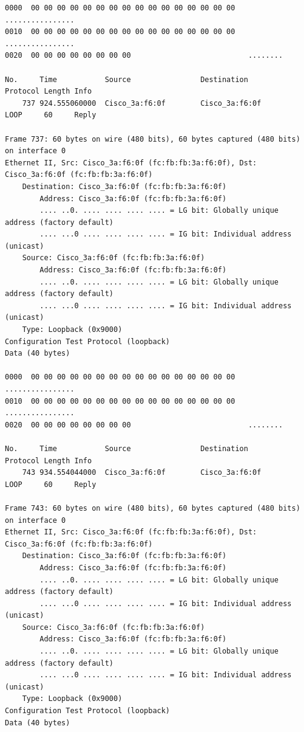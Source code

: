 \documentclass[a4paper,11pt]{article}
\begin{document}
\begin{lstlisting}
0000  00 00 00 00 00 00 00 00 00 00 00 00 00 00 00 00   ................
0010  00 00 00 00 00 00 00 00 00 00 00 00 00 00 00 00   ................
0020  00 00 00 00 00 00 00 00                           ........

No.     Time           Source                Destination           Protocol Length Info
    737 924.555060000  Cisco_3a:f6:0f        Cisco_3a:f6:0f        LOOP     60     Reply

Frame 737: 60 bytes on wire (480 bits), 60 bytes captured (480 bits) on interface 0
Ethernet II, Src: Cisco_3a:f6:0f (fc:fb:fb:3a:f6:0f), Dst: Cisco_3a:f6:0f (fc:fb:fb:3a:f6:0f)
    Destination: Cisco_3a:f6:0f (fc:fb:fb:3a:f6:0f)
        Address: Cisco_3a:f6:0f (fc:fb:fb:3a:f6:0f)
        .... ..0. .... .... .... .... = LG bit: Globally unique address (factory default)
        .... ...0 .... .... .... .... = IG bit: Individual address (unicast)
    Source: Cisco_3a:f6:0f (fc:fb:fb:3a:f6:0f)
        Address: Cisco_3a:f6:0f (fc:fb:fb:3a:f6:0f)
        .... ..0. .... .... .... .... = LG bit: Globally unique address (factory default)
        .... ...0 .... .... .... .... = IG bit: Individual address (unicast)
    Type: Loopback (0x9000)
Configuration Test Protocol (loopback)
Data (40 bytes)

0000  00 00 00 00 00 00 00 00 00 00 00 00 00 00 00 00   ................
0010  00 00 00 00 00 00 00 00 00 00 00 00 00 00 00 00   ................
0020  00 00 00 00 00 00 00 00                           ........

No.     Time           Source                Destination           Protocol Length Info
    743 934.554044000  Cisco_3a:f6:0f        Cisco_3a:f6:0f        LOOP     60     Reply

Frame 743: 60 bytes on wire (480 bits), 60 bytes captured (480 bits) on interface 0
Ethernet II, Src: Cisco_3a:f6:0f (fc:fb:fb:3a:f6:0f), Dst: Cisco_3a:f6:0f (fc:fb:fb:3a:f6:0f)
    Destination: Cisco_3a:f6:0f (fc:fb:fb:3a:f6:0f)
        Address: Cisco_3a:f6:0f (fc:fb:fb:3a:f6:0f)
        .... ..0. .... .... .... .... = LG bit: Globally unique address (factory default)
        .... ...0 .... .... .... .... = IG bit: Individual address (unicast)
    Source: Cisco_3a:f6:0f (fc:fb:fb:3a:f6:0f)
        Address: Cisco_3a:f6:0f (fc:fb:fb:3a:f6:0f)
        .... ..0. .... .... .... .... = LG bit: Globally unique address (factory default)
        .... ...0 .... .... .... .... = IG bit: Individual address (unicast)
    Type: Loopback (0x9000)
Configuration Test Protocol (loopback)
Data (40 bytes)


\end{lstlisting}
\end{document}

